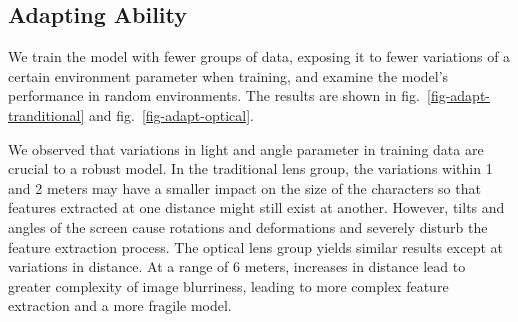 \subsection{Adapting Ability}
We train the model with fewer groups of data, exposing it to fewer variations of a certain environment parameter when training, and examine the model's performance in random environments. The results are shown in fig.~\ref{fig-adapt-tranditional} and fig.~\ref{fig-adapt-optical}.

We observed that variations in light and angle parameter in training data are crucial to a robust model. In the traditional lens group, the variations within 1 and 2 meters may have a smaller impact on the size of the characters
 so that features extracted at one distance might still exist at another.
 However, tilts and angles of the screen cause rotations and deformations and severely disturb the feature extraction process. The optical lens group yields similar results except at variations in distance. At a range of 6 meters, increases in distance lead to greater complexity of image blurriness, leading to more complex feature extraction and a more fragile model.

